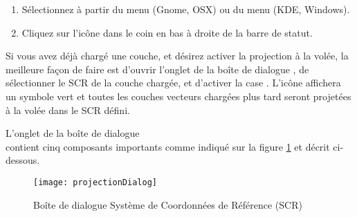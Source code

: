 \begin{enumerate}
\item Sélectionnez  à partir du  menu  (Gnome, OSX) ou du menu  (KDE, Windows).

\item Cliquez sur l'icône  dans le coin en bas à droite de la barre de statut.
\end{enumerate}

Si vous avez déjà chargé une couche, et désirez activer la projection à la volée, la meilleure façon de faire est d'ouvrir l'onglet  de la boîte de dialogue , de sélectionner le SCR de la couche chargée, et d'activer la case . L'icône  affichera un symbole vert et toutes les couches vecteurs chargées plus tard seront projetées à la volée dans le SCR défini.
 
L'onglet  de la boîte de dialogue\\
 contient cinq composants importants comme indiqué sur la figure \ref{fig:projections} et décrit ci-dessous.

\begin{figure}[ht]
   \begin{center}
   \texttt{[image: projectionDialog]}\caption{Boîte de dialogue Système de Coordonnées de Référence (SCR) \nixcaption} \label{fig:projections}
\end{center}
\end{figure}

